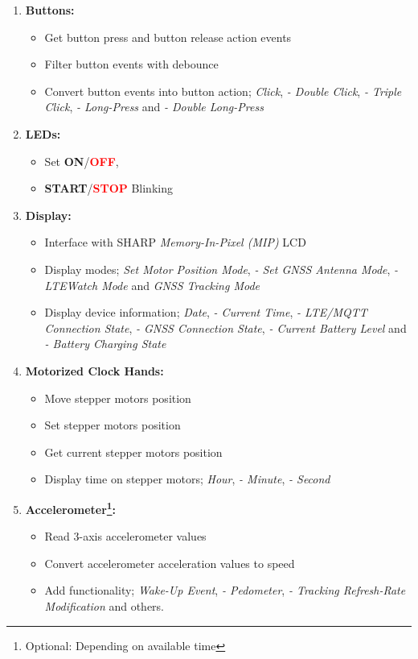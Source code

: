 \documentclass[report.tex]{subfiles}
\begin{document}
\begin{enumerate}
\item \textbf{Buttons:}
\begin{itemize}
\item Get button press and button release action events
\item Filter button events with debounce
\item Convert button events into button action; \textit{Click}, \textit{- Double Click}, \textit{- Triple Click}, \textit{- Long-Press} and \textit{- Double Long-Press}
\end{itemize}
\item \textbf{LEDs:}
\begin{itemize}
\item Set \textbf{\textcolor{mygreen}{ON}}/\textbf{\textcolor{red}{OFF}},
\item \textbf{\textcolor{mygreen}{START}}/\textbf{\textcolor{red}{STOP}} Blinking
\end{itemize}
\item \textbf{Display:}
\begin{itemize}
\item Interface with \textsc{SHARP} \textit{Memory-In-Pixel (MIP)} LCD
\item Display modes; \textit{Set Motor Position Mode}, \textit{- Set GNSS Antenna Mode}, \textit{- LTEWatch Mode} and \textit{GNSS Tracking Mode}
\item Display device information; \textit{Date}, \textit{- Current Time}, \textit{- LTE/MQTT Connection State}, \textit{- GNSS Connection State}, \textit{- Current Battery Level} and \textit{- Battery Charging State}
\end{itemize}
\item \textbf{Motorized Clock Hands:}
\begin{itemize}
\item Move stepper motors position
\item Set stepper motors position
\item Get current stepper motors position
\item Display time on stepper motors; \textit{Hour}, \textit{- Minute}, \textit{- Second}
\end{itemize}
\item \textbf{Accelerometer\footnote{Optional: Depending on available time}:}
\begin{itemize}
\item Read 3-axis accelerometer values
\item Convert accelerometer acceleration values to speed
\item Add functionality; \textit{Wake-Up Event}, \textit{- Pedometer}, \textit{- Tracking Refresh-Rate Modification} and others.
\end{itemize}
\end{enumerate}
\end{document}
